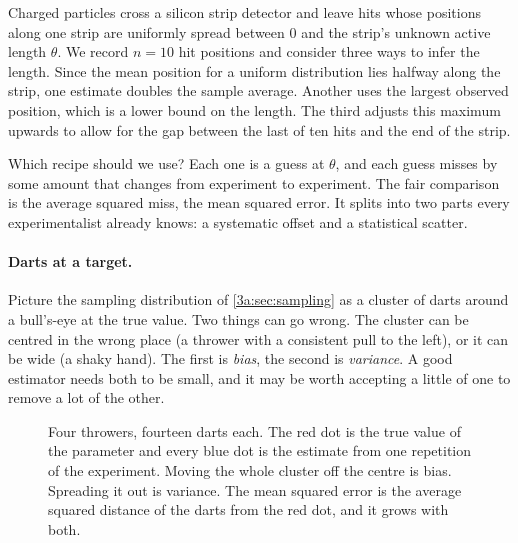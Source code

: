 Charged particles cross a silicon strip detector and leave hits whose
positions along one strip are uniformly spread between $0$ and the strip's
unknown active length $\theta$. We record $n=10$ hit positions and consider three ways to infer the length.
Since the mean position for a uniform distribution lies halfway along the
strip, one estimate doubles the sample average. Another uses the largest
observed position, which is a lower bound on the length. The third adjusts
this maximum upwards to allow for the gap between the last of ten hits and
the end of the strip.

Which recipe should we use? Each one is a guess at $\theta$, and each guess
misses by some amount that changes from experiment to experiment. The fair
comparison is the average squared miss, the mean squared error. It splits
into two parts every experimentalist already knows: a systematic offset and
a statistical scatter.

\paragraph{Darts at a target.}
Picture the sampling distribution of \cref{3a:sec:sampling} as a cluster of
darts around a bull's-eye at the true value. Two things can go wrong. The
cluster can be centred in the wrong place (a thrower with a consistent pull
to the left), or it can be wide (a shaky hand). The first is \emph{bias}, the
second is \emph{variance}. A good estimator needs both to be small, and it
may be worth accepting a little of one to remove a lot of the other.

\begin{figure}[htbp]
\centering
{}
\caption{Four throwers, fourteen darts each. The red dot is the true value of
the parameter and every blue dot is the estimate from one repetition of the
experiment. Moving the whole cluster off the centre is bias. Spreading it out
is variance. The mean squared error is the average squared distance of the
darts from the red dot, and it grows with both.}
\label{3a:fig:darts}
\end{figure}

